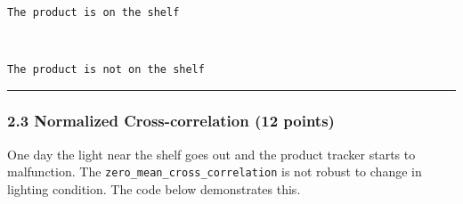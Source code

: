 \documentclass[11pt]{article}
\begin{document}
    \begin{center}
    \end{center}
    { \hspace*{\fill} \\}
    
    \begin{Verbatim}[commandchars=\\\{\}]
The product is on the shelf

    \end{Verbatim}

    \begin{center}
    \end{center}
    { \hspace*{\fill} \\}
    
    \begin{Verbatim}[commandchars=\\\{\}]
The product is not on the shelf

    \end{Verbatim}

    \begin{center}\rule{0.5\linewidth}{\linethickness}\end{center}

\subsubsection{2.3 Normalized Cross-correlation (12
points)}\label{normalized-cross-correlation-12-points}

One day the light near the shelf goes out and the product tracker starts
to malfunction. The \texttt{zero\_mean\_cross\_correlation} is not
robust to change in lighting condition. The code below demonstrates
this.
\end{document}
